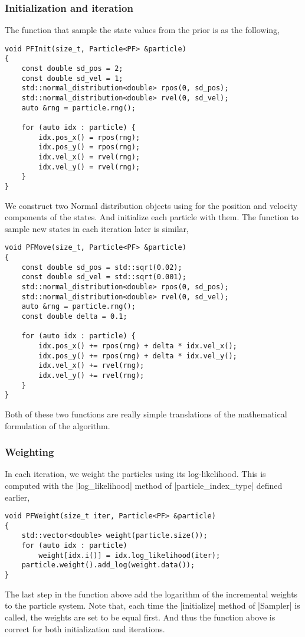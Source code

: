 \subsubsection{Initialization and iteration}

The function that sample the state values from the prior is as the following,
\begin{verbatim}
void PFInit(size_t, Particle<PF> &particle)
{
    const double sd_pos = 2;
    const double sd_vel = 1;
    std::normal_distribution<double> rpos(0, sd_pos);
    std::normal_distribution<double> rvel(0, sd_vel);
    auto &rng = particle.rng();

    for (auto idx : particle) {
        idx.pos_x() = rpos(rng);
        idx.pos_y() = rpos(rng);
        idx.vel_x() = rvel(rng);
        idx.vel_y() = rvel(rng);
    }
}
\end{verbatim}
We construct two Normal distribution objects using for the position and
velocity components of the states. And initialize each particle with them. The
function to sample new states in each iteration later is similar,
\begin{verbatim}
void PFMove(size_t, Particle<PF> &particle)
{
    const double sd_pos = std::sqrt(0.02);
    const double sd_vel = std::sqrt(0.001);
    std::normal_distribution<double> rpos(0, sd_pos);
    std::normal_distribution<double> rvel(0, sd_vel);
    auto &rng = particle.rng();
    const double delta = 0.1;

    for (auto idx : particle) {
        idx.pos_x() += rpos(rng) + delta * idx.vel_x();
        idx.pos_y() += rpos(rng) + delta * idx.vel_y();
        idx.vel_x() += rvel(rng);
        idx.vel_y() += rvel(rng);
    }
}
\end{verbatim}
Both of these two functions are really simple translations of the mathematical
formulation of the algorithm.

\subsubsection{Weighting}

In each iteration, we weight the particles using its log-likelihood. This is
computed with the |log_likelihood| method of |particle_index_type| defined
earlier,
\begin{verbatim}
void PFWeight(size_t iter, Particle<PF> &particle)
{
    std::vector<double> weight(particle.size());
    for (auto idx : particle)
        weight[idx.i()] = idx.log_likelihood(iter);
    particle.weight().add_log(weight.data());
}
\end{verbatim}
The last step in the function above add the logarithm of the incremental
weights to the particle system. Note that, each time the |initialize| method of
|Sampler| is called, the weights are set to be equal first. And thus the
function above is correct for both initialization and iterations.

